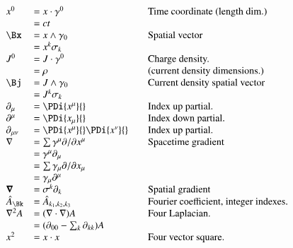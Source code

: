 \documentclass{article}
\begin{document}
\begin{equation*}
\begin{array}{l l l}
x^{0} &= x \cdot \gamma^0 & \quad \mbox{Time coordinate (length dim.)} \\
      &= c t \\
\Bx &= x \wedge \gamma_0 & \quad \mbox{Spatial vector} \\
    &= x^k \sigma_k \\
J^{0} &= J \cdot \gamma^0 & \quad \mbox{Charge density.} \\
      &= \rho & \quad \mbox{(current density dimensions.)} \\
\Bj &= J \wedge \gamma_0 & \quad \mbox{Current density spatial vector} \\
    &= J^k \sigma_k \\ %
% 
\partial_{\mu} &= \PDi{x^\mu}{} & \quad \mbox{Index up partial.} \\
\partial^{\mu} &= \PDi{x_\mu}{} & \quad \mbox{Index down partial.} \\
\partial_{\mu\nu} &= \PDi{x^\mu}{}\PDi{x^\nu}{} & \quad \mbox{Index up partial.} \\
\grad &= \sum \gamma^{\mu} \partial/\partial {x^{\mu}} & \quad \mbox{Spacetime gradient} \\
      &= \gamma^{\mu}\partial_{\mu} \\
      &= \sum \gamma_{\mu} \partial/\partial {x_{\mu}} \\
      &= \gamma_{\mu}\partial^{\mu} \\
\spacegrad &= \sigma^{k} \partial_k & \quad \mbox{Spatial gradient} \\
\hat{A}_{\Bk} &= \hat{A}_{k_1,k_2,k_3} & \quad \mbox{Fourier coefficient, integer indexes.} \\ 
\grad^2 A
   &= (\grad \cdot \grad) A & \quad \mbox{Four Laplacian. } \\
   &= (\partial_{00} - \sum_k \partial_{kk}) A & \\
x^2 &= x \cdot x & \quad \mbox{Four vector square. } \\

\end{array}
\end{equation*}
\end{document}
